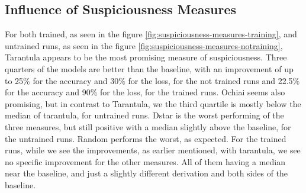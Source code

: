 \subsection{Influence of Suspiciousness Measures}\label{subsec:influence-of-suspiciousness-measures}
For both trained, as seen in the figure \ref{fig:suspiciousness-measures-training}, and untrained runs, as seen in the figure \ref{fig:suspiciousness-measures-notraining}, Tarantula appears to be the most promising measure of suspiciousness.
Three quarters of the models are better than the baseline, with an improvement of up to 25\% for the accuracy and 30\% for the loss, for the not trained runs and 22.5\% for the accuracy and 90\% for the loss, for the trained runs.
Ochiai seems also promising, but in contrast to Tarantula, we the third quartile is mostly below the median of tarantula, for untrained runs.
Dstar is the worst performing of the three measures, but still positive with a median slightly above the baseline, for the untrained runs.
Random performs the worst, as expected.
For the trained runs, while we see the improvements, as earlier mentioned, with tarantula, we see no specific improvement for the other measures.
All of them having a median near the baseline, and just a slightly different derivation and both sides of the baseline.
